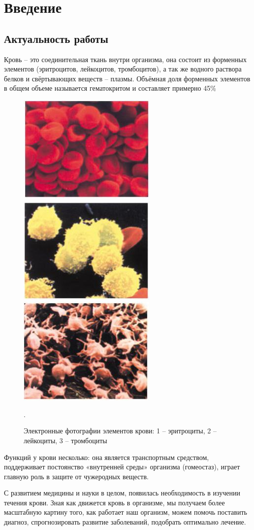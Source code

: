 \section{Введение}
\subsection{Актуальность работы}
Кровь -- это соединительная ткань внутри организма, она состоит из форменных элементов (эритроцитов, лейкоцитов, тромбоцитов), 
а так же водного раствора белков и свёртывающих веществ -- плазмы. Объёмная доля форменных элементов в общем объеме называется 
гематокритом и составляет примерно 45\%
\begin{figure}[h]
\centering
\includegraphics[width=0.3\linewidth]{erotr.jpg}
\includegraphics[width=0.3\linewidth]{leiko.jpg}
\includegraphics[width=0.3\linewidth]{trombo.jpg}
\caption{ Электронные фотографии элементов крови: 1 -- эритроциты, 2 -- лейкоциты, 3 -- тромбоциты ~\cite{rls:2003}}.
\label{fig:mpr}
\end{figure}
Функций у крови несколько: она является транспортным средством, поддерживает постоянство «внутренней среды» организма (гомеостаз), 
играет главную роль в защите от чужеродных веществ.

С развитием медицины и науки в целом, появилась необходимость в изучении течения крови. Зная как движется кровь в организме, 
мы получаем более масштабную картину того, как работает наш организм, можем помочь поставить диагноз, спрогнозировать развитие 
заболеваний, подобрать оптимально лечение.

